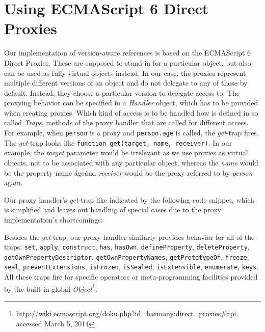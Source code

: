 \section{Using ECMAScript 6 Direct Proxies}

Our implementation of version-aware references is based on the ECMAScript 6 Direct Proxies.
These are supposed to stand-in for a particular object, but also can be used as fully virtual objects instead.
In our case, the proxies represent multiple different versions of an object and do not delegate to any of those by default.
Instead, they choose a particular version to delegate access to.
The proxying behavior can be specified in a \emph{Handler} object, which has to be provided when creating proxies.
Which kind of access is to be handled how is defined in so called \emph{Traps}, methods of the proxy handler that are called for different access.
For example, when \lstinline{person} is a proxy and \lstinline{person.age} is called, the \emph{get}-trap fires.
The \emph{get}-trap looks like \lstinline{function get(target, name, receiver)}.
In our example, the \emph{target} parameter would be irrelevant as we use proxies as virtual objects, not to be associated with any particular object, whereas the \emph{name} would be the property name \'age\' and \emph{receiver} would be the proxy referred to by \emph{person} again.

Our proxy handler's \emph{get}-trap  like indicated by the following code snippet, which is simplified and leaves out handling of special cases due to the proxy implementation's shortcomings:

\iffalse
\begin{verbatim}\fi
\begin{code}{}{}
get: function(.., name, receiver) {
    var version = this.currentVersion();
    
    if (name === 'isProxy') {
    // more special cases...
    
    result = version[name];
    
    return this.ensureProxied(result);
}
\end{code}
\iffalse
\end{verbatim}\fi

Besides the \emph{get}-trap, our proxy handler similarly provides behavior for all of the traps: \lstinline{set}, \lstinline{apply}, \lstinline{construct}, \lstinline{has}, \lstinline{hasOwn}, \lstinline{defineProperty}, \lstinline{deleteProperty}, \lstinline{getOwnPropertyDescriptor}, \lstinline{getOwnPropertyNames}, \lstinline{getPrototypeOf}, \lstinline{freeze}, \lstinline{seal}, \lstinline{preventExtensions}, \lstinline{isFrozen}, \lstinline{isSealed}, \lstinline{isExtensible}, \lstinline{enumerate}, \lstinline{keys}.
All these traps fire for specific operators or meta-programming facilities provided by the built-in global \emph{Object}\footnote{\url{http://wiki.ecmascript.org/doku.php?id=harmony:direct_proxies\#api}, accessed March 5, 2014}.


